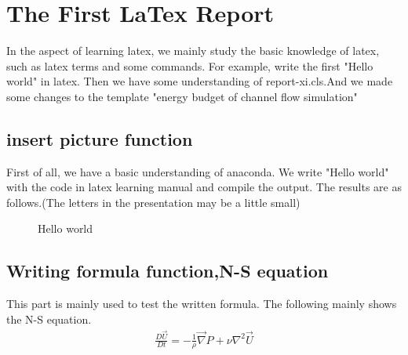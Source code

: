 \section{The First LaTex Report}
In the aspect of learning latex, we mainly study the basic knowledge of latex, such as latex terms and some commands. For example, write the first "Hello world" in latex. Then we have some understanding of report-xi.cls.And we made some changes to the template "energy budget of channel flow simulation"
\subsection{insert picture function}
First of all, we have a basic understanding of anaconda. We write "Hello world" with the code in latex learning manual and compile the output. The results are as follows.(The letters in the presentation may be a little small)
\begin{figure}[htbp]
\centering
 \caption{Hello world}
\label{pd}
\end{figure}



\subsection{Writing formula function,N-S equation}
This part is mainly used to test the written formula. The following mainly shows the N-S equation.
\begin{equation}
\begin{aligned}
\frac{D\vec{U}}{Dt}=-\frac{1}{\rho}\vec{\nabla}P+\nu\nabla^2\vec{U}
\end{aligned}
\end{equation}

